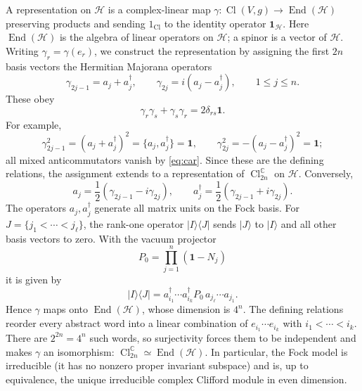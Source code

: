 \documentclass{article}
\theoremstyle{definition}
\theoremstyle{remark}
\newcommand{\C}{\mathbb C}
\newcommand{\Cl}{\operatorname{Cl}}
\newcommand{\End}{\operatorname{End}}
\newcommand{\ket}[1]{\lvert #1\rangle}
\begin{document}
A representation on $\mathcal H$ is a complex-linear map
$\gamma:\Cl(V,g)\to\End(\mathcal H)$ preserving products and sending
$1_{\Cl}$ to the identity operator $\mathbf1_{\mathcal H}$. Here
$\End(\mathcal H)$ is the algebra of linear operators on $\mathcal H$;
a spinor is a vector of $\mathcal H$. Writing $\gamma_r=\gamma(e_r)$, we construct
the representation by assigning the first $2n$ basis vectors the Hermitian
Majorana operators
\begin{equation}
 \gamma_{2j-1}=a_j+a_j^\dagger,\qquad
 \gamma_{2j}=i(a_j-a_j^\dagger),
 \qquad 1\le j\le n.
\label{gamma_by_a}
\end{equation}
These obey
\begin{equation}
 \gamma_r\gamma_s+\gamma_s\gamma_r=2\delta_{rs}\mathbf 1 .
\end{equation}
For example,
\begin{equation*}
 \gamma_{2j-1}^2=(a_j+a_j^\dagger)^2
 =\{a_j,a_j^\dagger\}=\mathbf1,
 \qquad
 \gamma_{2j}^2=-(a_j-a_j^\dagger)^2=\mathbf1;
\end{equation*}
all mixed anticommutators vanish by \eqref{eq:car}. Since these are the
defining relations, the assignment extends to a representation of
$\Cl_{2n}^\C$ on $\mathcal H$. Conversely,
\begin{equation}
 a_j=\frac12(\gamma_{2j-1}-i\gamma_{2j}),
 \qquad
 a_j^\dagger=\frac12(\gamma_{2j-1}+i\gamma_{2j}).
 \label{eq:gamma-to-fock}
\end{equation}
The operators $a_j,a_j^\dagger$ generate all matrix units on the Fock basis.
For $J=\{j_1<\cdots<j_\ell\}$, the rank-one operator
$\ket I\!\langle J\rvert$ sends $\ket J$ to $\ket I$ and all other basis
vectors to zero. With the vacuum projector
\begin{equation*}
 P_0=\prod_{j=1}^n(\mathbf1-N_j)
\end{equation*}
it is given by
\begin{equation*}
 \ket I\!\langle J\rvert
 =a_{i_1}^\dagger\cdots a_{i_k}^\dagger
  P_0\,a_{j_\ell}\cdots a_{j_1}.
\end{equation*}
Hence $\gamma$ maps onto $\End(\mathcal H)$, whose dimension is $4^n$.
The defining relations reorder every abstract word into a linear combination
of $e_{i_1}\cdots e_{i_k}$ with $i_1<\cdots<i_k$. There are $2^{2n}=4^n$
such words, so surjectivity forces them to be independent and makes $\gamma$
an isomorphism:
$\Cl_{2n}^\C\simeq\End(\mathcal H)$.  In particular, the Fock model is irreducible (it has no nonzero proper
invariant subspace) and is, up to equivalence, the unique irreducible
complex Clifford module in even dimension.
\end{document}
